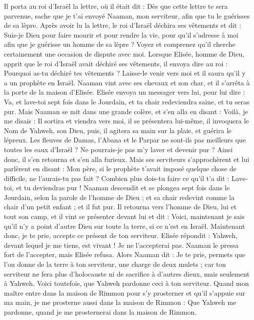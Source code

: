 \begin{multicols}{2}
Il porta au roi d'Israël la lettre, où il était dit : Dès que cette lettre te sera parvenue, sache que je t'ai envoyé Naaman, mon serviteur, afin que tu le guérisses de sa lèpre.
Après avoir lu la lettre, le roi d'Israël déchira ses vêtements et dit : Suis-je Dieu pour faire mourir et pour rendre la vie, pour qu'il s'adresse à moi afin que je guérisse un homme de sa lèpre ? Voyez et comprenez qu'il cherche certainement une occasion de dispute avec moi.
Lorsque Elisée, homme de Dieu, apprit que le roi d'Israël avait déchiré ses vêtements, il envoya dire au roi : Pourquoi as-tu déchiré tes vêtements ? Laisse-le venir vers moi et il saura qu'il y a un prophète en Israël.
Naaman vint avec ses chevaux et son char, et il s'arrêta à la porte de la maison d'Elisée.
Elisée envoya un messager vers lui, pour lui dire : Va, et lave-toi sept fois dans le Jourdain, et ta chair redeviendra saine, et tu seras pur.
Mais Naaman se mit dans une grande colère, et s'en alla en disant : Voilà, je me disais : Il sortira et viendra vers moi, il se présentera lui-même, il invoquera le Nom de Yahweh, son Dieu, puis, il agitera sa main sur la plaie, et guérira le lépreux.
Les fleuves de Damas, l'Abana et le Parpar ne sont-ils pas meilleurs que toutes les eaux d'Israël ? Ne pourrais-je pas m'y laver et devenir pur ? Ainsi donc, il s'en retourna et s'en alla furieux.
Mais ses serviteurs s'approchèrent et lui parlèrent en disant : Mon père, si le prophète t'avait imposé quelque chose de difficile, ne l'aurais-tu pas fait ? Combien plus dois-tu faire ce qu'il t'a dit : Lave-toi, et tu deviendras pur !
Naaman descendit et se plongea sept fois dans le Jourdain, selon la parole de l'homme de Dieu ; et sa chair redevint comme la chair d'un petit enfant ; et il fut pur.
Il retourna vers l'homme de Dieu, lui et tout son camp, et il vint se présenter devant lui et dit : Voici, maintenant je sais qu'il n'y a point d'autre Dieu sur toute la terre, si ce n'est en Israël. Maintenant donc, je te prie, accepte ce présent de ton serviteur.
Elisée répondit : Yahweh, devant lequel je me tiens, est vivant ! Je ne l'accepterai pas. Naaman le pressa fort de l'accepter, mais Elisée refusa.
Alors Naaman dit : Je te prie, permets que l'on donne de la terre à ton serviteur, une charge de deux mulets ; car ton serviteur ne fera plus d'holocauste ni de sacrifice à d'autres dieux, mais seulement à Yahweh.
Voici toutefois, que Yahweh pardonne ceci à ton serviteur. Quand mon maître entre dans la maison de Rimmon pour s'y prosterner et qu'il s'appuie sur ma main, je me prosterne aussi dans la maison de Rimmon : Que Yahweh me pardonne, quand je me prosternerai dans la maison de Rimmon.

\end{multicols}
